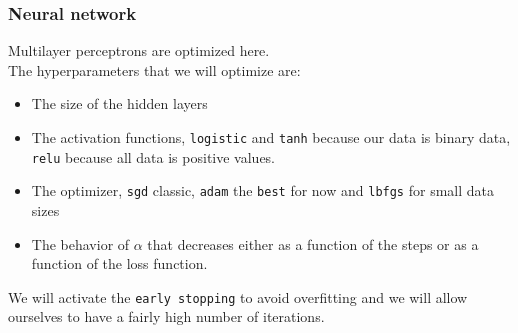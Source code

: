 \documentclass[
]{article}
\providecommand{\tightlist}{%
  \setlength{\itemsep}{0pt}\setlength{\parskip}{0pt}}
\begin{document}
\hypertarget{neural-network}{%
\subsubsection{Neural network}\label{neural-network}}

Multilayer perceptrons are optimized here.\\
The hyperparameters that we will optimize are:

\begin{itemize}
\tightlist
\item
  The size of the hidden layers
\item
  The activation functions, \texttt{logistic} and \texttt{tanh} because
  our data is binary data, \texttt{relu} because all data is positive
  values.
\item
  The optimizer, \texttt{sgd} classic, \texttt{adam} the \texttt{best}
  for now and \texttt{lbfgs} for small data sizes
\item
  The behavior of \(\alpha\) that decreases either as a function of the
  steps or as a function of the loss function.
\end{itemize}

We will activate the \texttt{early\ stopping} to avoid overfitting and
we will allow ourselves to have a fairly high number of iterations.
\end{document}
